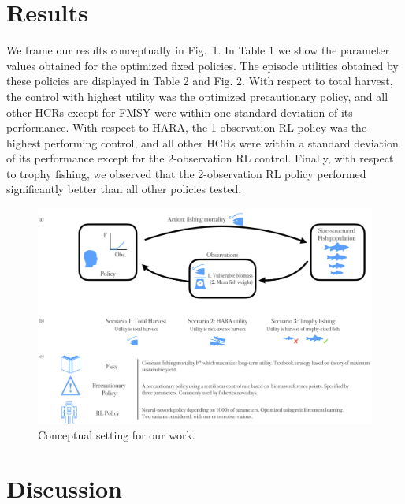 \documentclass[floatfix,nofootinbib,longbibliography,notitlepage]{revtex4-2}
\begin{document}
%
%
%
\section{Results}

We frame our results conceptually in Fig.~1.
In Table 1 we show the parameter values obtained for the optimized fixed policies. The episode utilities obtained by these policies are displayed in Table 2 and Fig. 2. 
With respect to total harvest, the control with highest utility was the optimized precautionary policy, and all other HCRs except for FMSY were within one standard deviation of its performance. 
With respect to HARA, the 1-observation RL policy was the highest performing control, and all other HCRs were within a standard deviation of its performance except for the 2-observation RL control. 
Finally, with respect to trophy fishing, we observed that the 2-observation RL policy performed significantly better than all other policies tested.

\begin{figure}[h!]
	\includegraphics[width=.9\linewidth]{conceptual.png}
\caption{
\label{fig:conceptual}
Conceptual setting for our work.
}
\end{figure}



%
%
%
\section{Discussion}




 

\end{document}
